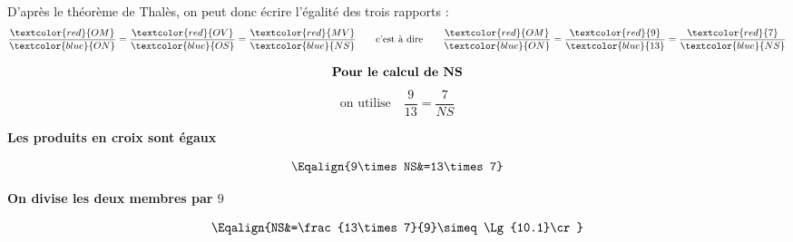 \begin{methode*1}
\begin{itemize}
            \end{itemize}
            D'après le théorème de Thalès, on peut donc écrire l'égalité des trois rapports :
            $$\frac{\textcolor{red}{OM}}{\textcolor{blue}{ON}}=\frac{\textcolor{red}{OV}}{\textcolor{blue}{OS}}=\frac{\textcolor{red}{MV}}{\textcolor{blue}{NS}}\qquad\mbox{c'est à dire}\qquad\frac{\textcolor{red}{OM}}{\textcolor{blue}{ON}}=\frac{\textcolor{red}{9}}{\textcolor{blue}{13}}=\frac{\textcolor{red}{7}}{\textcolor{blue}{NS}}$$

                $$\mbox{\bf Pour le calcul de NS}$$
                $$\mbox{on utilise} \quad \dfrac{9}{13}=\dfrac{7}{NS}$$
                \begin{center}
                    {\bf Les produits en croix sont égaux}
                \end{center}
                $$\Eqalign{9\times NS&=13\times7}$$
                \begin{center}
                    {\bf On divise les deux membres par $9$}
                \end{center}
                $$\Eqalign{NS&=\frac{13\times7}{9}\simeq\Lg{10.1}\cr}$$
        \end{methode*1}